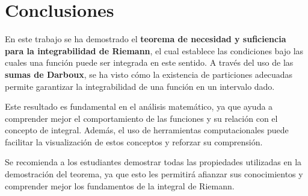 \documentclass[10pt]{article}
\begin{document}
\section{Conclusiones}
En este trabajo se ha demostrado el \textbf{teorema de necesidad y suficiencia para la integrabilidad de Riemann}, el cual establece las condiciones bajo las cuales una función puede ser integrada en este sentido. A través del uso de las \textbf{sumas de Darboux}, se ha visto cómo la existencia de particiones adecuadas permite garantizar la integrabilidad de una función en un intervalo dado. \par

Este resultado es fundamental en el análisis matemático, ya que ayuda a comprender mejor el comportamiento de las funciones y su relación con el concepto de integral. Además, el uso de herramientas computacionales puede facilitar la visualización de estos conceptos y reforzar su comprensión. \par

Se recomienda a los estudiantes demostrar todas las propiedades utilizadas en la demostración del teorema, ya que esto les permitirá afianzar sus conocimientos y comprender mejor los fundamentos de la integral de Riemann. \par

 
\end{document}
